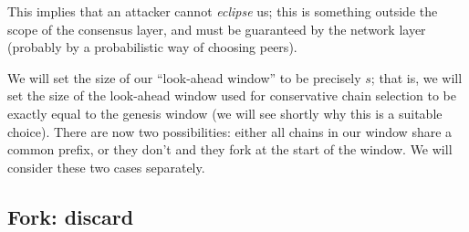 This implies that an attacker cannot \emph{eclipse} us; this is something
outside the scope of the consensus layer, and must be guaranteed by the network
layer (probably by a probabilistic way of choosing peers).

We will set the size of our ``look-ahead window'' to be precisely $s$; that is,
we will set the size of the look-ahead window used for conservative chain
selection to be exactly equal to the genesis window (we will see shortly why
this is a suitable choice). There are now two possibilities: either all chains
in our window share a common prefix, or they don't and they fork at the start of
the window. We will consider these two cases separately.

\subsection{Fork: discard}
\label{genesis:discard}

